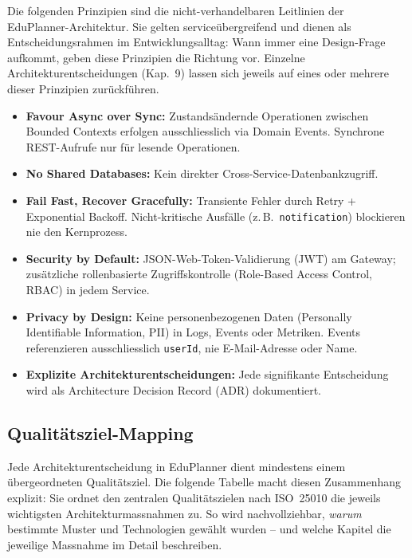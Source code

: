 Die folgenden Prinzipien sind die nicht-verhandelbaren Leitlinien
der EduPlanner-Architektur. Sie gelten serviceübergreifend und
dienen als Entscheidungsrahmen im Entwicklungsalltag: Wann immer
eine Design-Frage aufkommt, geben diese Prinzipien die Richtung
vor. Einzelne Architekturentscheidungen (Kap.~9) lassen sich
jeweils auf eines oder mehrere dieser Prinzipien zurückführen.

\begin{itemize}[leftmargin=1.5em]
  \item \textbf{Favour Async over Sync:}
  Zustandsändernde Operationen zwischen Bounded Contexts
  erfolgen ausschliesslich via Domain Events. Synchrone
  REST-Aufrufe nur für lesende Operationen.
  \item \textbf{No Shared Databases:}
  Kein direkter Cross-Service-Datenbankzugriff.
  \item \textbf{Fail Fast, Recover Gracefully:}
  Transiente Fehler durch Retry + Exponential Backoff.
  Nicht-kritische Ausfälle (z.\,B.\ \texttt{notification})
  blockieren nie den Kernprozess.
  \item \textbf{Security by Default:}
  JSON-Web-Token-Validierung (JWT) am Gateway;
  zusätzliche rollenbasierte Zugriffskontrolle
  (Role-Based Access Control, RBAC) in jedem Service.
  \item \textbf{Privacy by Design:}
  Keine personenbezogenen Daten (Personally Identifiable
  Information, PII) in Logs, Events oder Metriken. Events
  referenzieren ausschliesslich \texttt{userId}, nie
  E-Mail-Adresse oder Name.
  \item \textbf{Explizite Architekturentscheidungen:}
  Jede signifikante Entscheidung wird als Architecture
  Decision Record (ADR) dokumentiert.
\end{itemize}


\subsection{Qualitätsziel-Mapping}

Jede Architekturentscheidung in EduPlanner dient mindestens einem
übergeordneten Qualitätsziel. Die folgende Tabelle macht diesen
Zusammenhang explizit: Sie ordnet den zentralen Qualitätszielen
nach ISO~25010\footnotemark{} die jeweils wichtigsten
Architekturmassnahmen zu. So wird nachvollziehbar, \emph{warum}
bestimmte Muster und Technologien gewählt wurden -- und welche
Kapitel die jeweilige Massnahme im Detail beschreiben.

